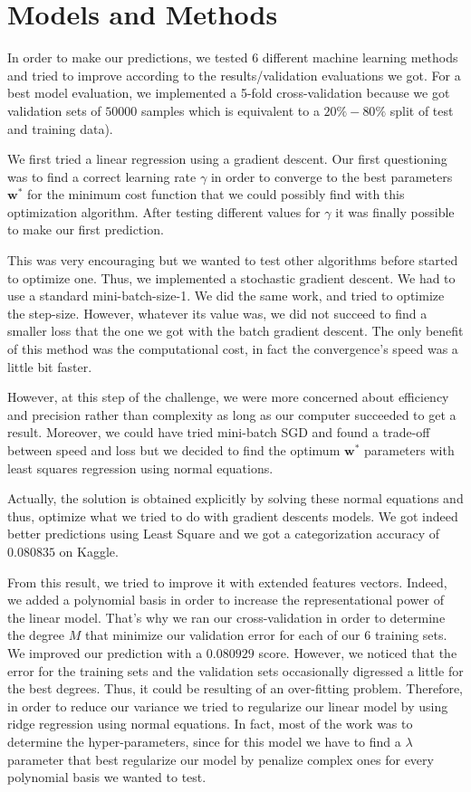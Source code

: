 \documentclass[10pt,conference,compsocconf]{IEEEtran}
\begin{document}
\section{Models and Methods}
\label{sec:structure-paper}

In order to make our predictions, we tested $6$ different machine learning methods and tried to improve according to the results/validation evaluations we got. For a best model evaluation, we implemented a 5-fold cross-validation because we got validation sets of $50 000$ samples which is equivalent to a $20\%-80\%$ split of test and training data). 

We first tried a linear regression using a gradient descent. Our first questioning was to find a correct learning rate $\gamma$ in order to converge to the best parameters $\mathbf{w^*}$ for the minimum cost function that we could possibly find with this optimization algorithm. After testing different values for $\gamma$ it was finally possible to make our first prediction. 

This was very encouraging but we wanted to test other algorithms before started to optimize one. Thus, we implemented a stochastic gradient descent. We had to use a standard mini-batch-size-1. We did the same work, and tried to optimize the step-size. However, whatever its value was, we did not succeed to find a smaller loss that the one we got with the batch gradient descent. The only benefit of this method was the computational cost, in fact the convergence's speed was a little bit faster. 

However, at this step of the challenge, we were more concerned about efficiency and precision rather than complexity as long as our computer succeeded to get a result. Moreover, we could have tried mini-batch SGD and found a trade-off between speed and loss but we decided to find the optimum $\mathbf{w^*}$ parameters with least squares regression using normal equations. 

Actually, the solution is obtained explicitly by solving these normal equations and thus, optimize what we tried to do with gradient descents models. We got indeed better predictions using Least Square and we got a categorization accuracy of $0.080835$ on Kaggle. 

From this result, we tried to improve it with extended features vectors. Indeed, we added a polynomial basis in order to increase the representational power of the linear model. That's why we ran our cross-validation in order to determine the degree $M$ that minimize our validation error for each of our $6$ training sets. We improved our prediction with a $0.080929$ score. However, we noticed that the error for the training sets and the validation sets occasionally digressed a little for the best degrees. Thus, it could be resulting of an over-fitting problem. Therefore, in order to reduce our variance we tried to regularize our linear model by using ridge regression using normal equations. In fact, most of the work was to determine the hyper-parameters, since for this model we have to find a $\lambda$ parameter that best regularize our model by penalize complex ones for every polynomial basis we wanted to test. 
\end{document}
